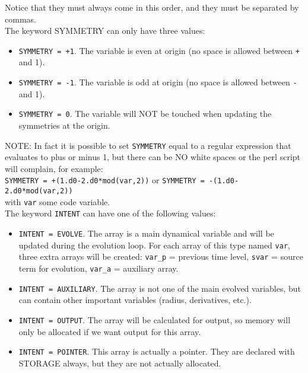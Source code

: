 \documentclass[12pt]{article}
\begin{document}
Notice that they must always come in this order, and they
must be separated by commas. \\

The keyword SYMMETRY can only have three values:

\begin{itemize}

\item \texttt{SYMMETRY = +1}. The variable is even at origin (no space
  is allowed between \texttt{+} and 1).

\item \texttt{SYMMETRY = -1}. The variable is odd at origin (no space
  is allowed between \texttt{-} and 1).

\item \texttt{SYMMETRY = 0}. The variable will NOT be touched when
  updating the symmetries at the origin.

\end{itemize}

NOTE: In fact it is possible to set \texttt{SYMMETRY} equal to a
regular expression that evaluates to plus or minus 1, but there can be
NO white spaces or the perl script will complain, for example: \\

\texttt{SYMMETRY = +(1.d0-2.d0*mod(var,2))} or \texttt{SYMMETRY = -(1.d0-2.d0*mod(var,2))} \\

with \texttt{var} some code variable. \\

The keyword \texttt{INTENT} can have one of the following values:

\begin{itemize}

\item \texttt{INTENT = EVOLVE}.  The array is a main dynamical
  variable and will be updated during the evolution loop.  For each
  array of this type named \texttt{var}, three extra arrays will be
  created: \texttt{var\_p} = previous time level, \texttt{svar} =
  source term for evolution, \texttt{var\_a} = auxiliary array.

\item \texttt{INTENT = AUXILIARY}.  The array is not one of the main
  evolved variables, but can contain other important variables
  (radius, derivatives, etc.).

\item \texttt{INTENT = OUTPUT}.  The array will be calculated for
  output, so memory will only be allocated if we want output for this
  array.

\item \texttt{INTENT = POINTER}.  This array is actually a pointer.
  They are declared with STORAGE always, but they are not actually
  allocated.

\end{itemize}
\end{document}
